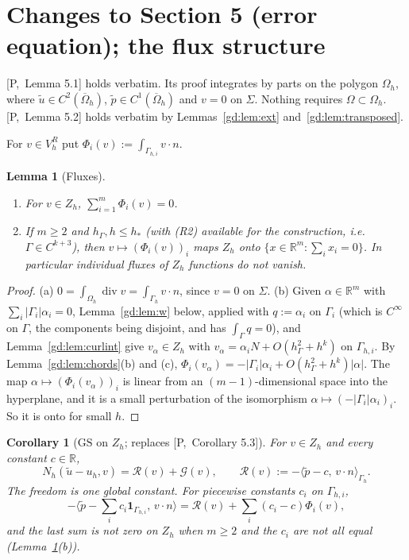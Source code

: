 \documentclass[11pt,reqno]{amsart}
\theoremstyle{plain}
\newtheorem{lemma}[theorem]{Lemma}
\newtheorem{corollary}[theorem]{Corollary}
\theoremstyle{definition}
\newcommand{\R}{\mathbb R}
\newcommand{\hG}{h_\Gamma}
\newcommand{\Gh}{\Gamma_h}
\newcommand{\Oh}{\Omega_h}
\newcommand{\VR}{V_h^R}
\newcommand{\Zh}{Z_h}
\newcommand{\ut}{\tilde u}
\newcommand{\pt}{\tilde p}
\newcommand{\ip}[2]{\langle #1,\, #2\rangle}
\newcommand{\GS}{\mathrm{GS}}
\renewcommand{\div}{\operatorname{div}}
\newcommand{\Rc}{\mathcal R}
\newcommand{\Gc}{\mathcal G}
\newcommand{\Pref}[1]{\textup{[P,~#1]}}
\begin{document}
\section{Changes to Section 5 (error equation); the flux structure}\label{gd:sec:err}

\Pref{Lemma 5.1} holds verbatim. Its proof integrates by parts on the polygon $\Oh$, where $\ut\in C^2(\overline\Oh)$, $\pt\in C^1(\overline\Oh)$ and $v=0$ on $\Sigma$. Nothing requires $\Omega\subset\Oh$. \Pref{Lemma 5.2} holds verbatim by Lemmas~\ref{gd:lem:ext} and~\ref{gd:lem:transposed}.

For $v\in\VR$ put $\Phi_i(v):=\int_{\Gamma_{h,i}}v\cdot n$.

\begin{lemma}[Fluxes]\label{gd:lem:flux}
\leavevmode
\begin{enumerate}[label=(\alph*)]
\item For $v\in\Zh$, $\sum_{i=1}^m\Phi_i(v)=0$.
\item If $m\ge2$ and $\hG,h\le h_\ast$ (with (R2) available for the construction, i.e.\ $\Gamma\in C^{k+3}$), then $v\mapsto(\Phi_i(v))_i$ maps $\Zh$ \emph{onto} $\{x\in\R^m:\sum_ix_i=0\}$. In particular individual fluxes of $\Zh$ functions do not vanish.
\end{enumerate}
\end{lemma}

\begin{proof}
(a) $0=\int_{\Oh}\div v=\int_{\Gh}v\cdot n$, since $v=0$ on $\Sigma$.
(b) Given $\alpha\in\R^m$ with $\sum_i|\Gamma_i|\alpha_i=0$, Lemma~\ref{gd:lem:w} below, applied with $q:=\alpha_i$ on $\Gamma_i$ (which is $C^\infty$ on $\Gamma$, the components being disjoint, and has $\int_\Gamma q=0$), and Lemma~\ref{gd:lem:curlint} give $v_\alpha\in\Zh$ with $v_\alpha=\alpha_iN+O(\hG^2+h^k)$ on $\Gamma_{h,i}$. By Lemma~\ref{gd:lem:chords}(b) and (c), $\Phi_i(v_\alpha)=-|\Gamma_i|\alpha_i+O(\hG^2+h^k)|\alpha|$. The map $\alpha\mapsto(\Phi_i(v_\alpha))_i$ is linear from an $(m-1)$-dimensional space into the hyperplane, and it is a small perturbation of the isomorphism $\alpha\mapsto(-|\Gamma_i|\alpha_i)_i$. So it is onto for small $h$.
\end{proof}

\begin{corollary}[$\GS$ on $\Zh$; replaces \Pref{Corollary 5.3}]\label{gd:cor:GSerr}
For $v\in\Zh$ and every constant $c\in\R$,
\[
N_h(\ut-u_h,v)=\Rc(v)+\Gc(v),\qquad\Rc(v):=-\ip{\pt-c}{v\cdot n}_{\Gh}.
\]
The freedom is \emph{one global} constant. For piecewise constants $c_i$ on $\Gamma_{h,i}$,
\[
-\ip{\pt-\textstyle\sum_ic_i\mathbf 1_{\Gamma_{h,i}}}{v\cdot n}=\Rc(v)+\sum_i(c_i-c)\Phi_i(v),
\]
and the last sum is not zero on $\Zh$ when $m\ge2$ and the $c_i$ are not all equal (Lemma~\ref{gd:lem:flux}(b)).
\end{corollary}
\end{document}
